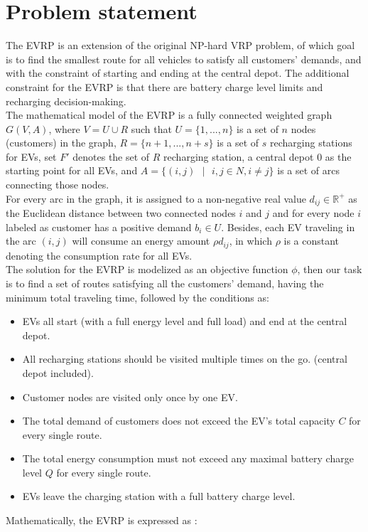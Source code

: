 \documentclass[conference,compsoc]{IEEEtran}
\begin{document}
\section{Problem statement}
The EVRP is an extension of the original NP-hard VRP problem, of which goal is to find the smallest route for all vehicles to satisfy all customers' demands, and with the constraint of starting and ending at the central depot. The additional constraint for the EVRP is that there are battery charge level limits and recharging decision-making.\\

The mathematical model of the EVRP is a fully connected weighted graph $G(V, A)$, where $V = U \cup R$ such that $U = \{1,...,n\}$  is a set of $n$ nodes (customers) in the graph, $R = \{n + 1,...,n + s\}$ is a set of $s$ recharging stations for EVs, set $F'$ denotes the set of $R$ recharging station, a central depot $0$ as the starting point for all EVs, and $A = \{\left(i, j\right)\text{ }|\text{ } i, j \in N, i \neq j\}$ is a set of arcs connecting those nodes.\\

For every arc in the graph, it is assigned to a non-negative real value $d_{ij} \in \mathbb{R}^+$ as the Euclidean distance between two connected nodes $i$ and $j$ and for every node $i$ labeled as customer has a positive demand $b_i \in U$. Besides, each EV traveling in the arc $\left(i, j\right)$ will consume an energy amount $\rho d_{ij}$, in which $\rho$ is a constant denoting the consumption rate for all EVs.\\

The solution for the EVRP is modelized as an objective function $\phi$, then our task is to find a set of routes satisfying all the customers' demand, having the minimum total traveling time, followed by the conditions as:
\begin{itemize}
    \item EVs all start (with a full energy level and full load) and end at the central depot.
    \item All recharging stations should be visited multiple times on the go. (central depot included).
    \item Customer nodes are visited only once by one EV.
    \item The total demand of customers does not exceed the EV's total capacity $C$ for every single route.
    \item The total energy consumption must not exceed any maximal battery charge level $Q$ for every single route.
    \item EVs leave the charging station with a full battery charge level.
\end{itemize}
Mathematically, the EVRP is expressed as \cite{evrp_benchmark}:
\end{document}
